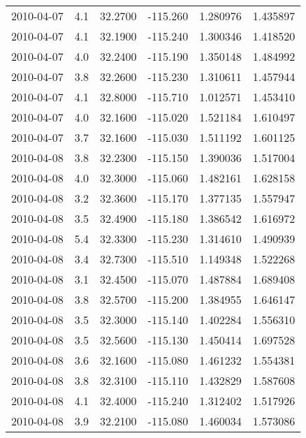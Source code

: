 \begin{tabular}{lrrrrr}
2010-04-07 &       4.1 &  32.2700 &  -115.260 &         1.280976 &         1.435897 \\
2010-04-07 &       4.1 &  32.1900 &  -115.240 &         1.300346 &         1.418520 \\
2010-04-07 &       4.0 &  32.2400 &  -115.190 &         1.350148 &         1.484992 \\
2010-04-07 &       3.8 &  32.2600 &  -115.230 &         1.310611 &         1.457944 \\
2010-04-07 &       4.1 &  32.8000 &  -115.710 &         1.012571 &         1.453410 \\
2010-04-07 &       4.0 &  32.1600 &  -115.020 &         1.521184 &         1.610497 \\
2010-04-07 &       3.7 &  32.1600 &  -115.030 &         1.511192 &         1.601125 \\
2010-04-08 &       3.8 &  32.2300 &  -115.150 &         1.390036 &         1.517004 \\
2010-04-08 &       4.0 &  32.3000 &  -115.060 &         1.482161 &         1.628158 \\
2010-04-08 &       3.2 &  32.3600 &  -115.170 &         1.377135 &         1.557947 \\
2010-04-08 &       3.5 &  32.4900 &  -115.180 &         1.386542 &         1.616972 \\
2010-04-08 &       5.4 &  32.3300 &  -115.230 &         1.314610 &         1.490939 \\
2010-04-08 &       3.4 &  32.7300 &  -115.510 &         1.149348 &         1.522268 \\
2010-04-08 &       3.1 &  32.4500 &  -115.070 &         1.487884 &         1.689408 \\
2010-04-08 &       3.8 &  32.5700 &  -115.200 &         1.384955 &         1.646147 \\
2010-04-08 &       3.5 &  32.3000 &  -115.140 &         1.402284 &         1.556310 \\
2010-04-08 &       3.5 &  32.5600 &  -115.130 &         1.450414 &         1.697528 \\
2010-04-08 &       3.6 &  32.1600 &  -115.080 &         1.461232 &         1.554381 \\
2010-04-08 &       3.8 &  32.3100 &  -115.110 &         1.432829 &         1.587608 \\
2010-04-08 &       4.1 &  32.4000 &  -115.240 &         1.312402 &         1.517926 \\
2010-04-08 &       3.9 &  32.2100 &  -115.080 &         1.460034 &         1.573086 \\

\end{tabular}
